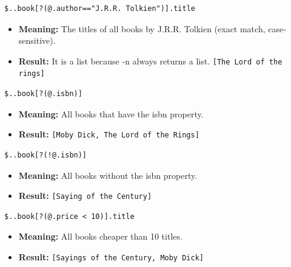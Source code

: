 \documentclass{article}
\newenvironment{codetemplate}[1][]{%
  \mybasecolorbox[#1]
  \itshape
}{%
  \endmybasecolorbox
}
\begin{document}
\begin{codetemplate}{}
\begin{verbatim}
$..book[?(@.author=="J.R.R. Tolkien")].title
\end{verbatim}
\end{codetemplate}
\begin{itemize}
    \item \textbf{Meaning:} The titles of all books by J.R.R. Tolkien (exact match, case-sensitive).
    \item \textbf{Result:} It is a list because -n always returns a list. \verb|[The Lord of the rings]|
\end{itemize}

\begin{codetemplate}{}
\begin{verbatim}
$..book[?(@.isbn)]
\end{verbatim}
\end{codetemplate}
\begin{itemize}
    \item \textbf{Meaning:} All books that have the isbn property.
    \item \textbf{Result:} \verb+[Moby Dick, The Lord of the Rings]+
\end{itemize}

\begin{codetemplate}{}
\begin{verbatim}
$..book[?(!@.isbn)]
\end{verbatim}
\end{codetemplate}
\begin{itemize}
    \item \textbf{Meaning:} All books without the isbn property.
    \item \textbf{Result:} \verb+[Saying of the Century]+
\end{itemize}

\begin{codetemplate}{}
\begin{verbatim}
$..book[?(@.price < 10)].title
\end{verbatim}
\end{codetemplate}
\begin{itemize}
    \item \textbf{Meaning:} All books cheaper than 10 titles.
    \item \textbf{Result:} \verb+[Sayings of the Century, Moby Dick]+
\end{itemize}
\end{document}
